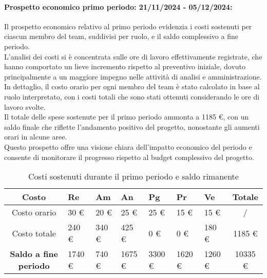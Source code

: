 \paragraph{Prospetto economico primo periodo: 21/11/2024 - 05/12/2024: }
Il prospetto economico relativo al primo periodo evidenzia i costi sostenuti per ciascun membro del team, suddivisi per ruolo, e il saldo complessivo a fine periodo.\\
L'analisi dei costi si è concentrata sulle ore di lavoro effettivamente registrate, che hanno comportato un lieve incremento rispetto al preventivo iniziale, dovuto principalmente a un maggiore impegno nelle attività di analisi e amministrazione.\\
In dettaglio, il costo orario per ogni membro del team è stato calcolato in base al ruolo interpretato, con i costi totali che sono stati ottenuti considerando le ore di lavoro svolte.\\
Il totale delle spese sostenute per il primo periodo ammonta a 1185 \euro, con un saldo finale che riflette l'andamento positivo del progetto, nonostante gli aumenti orari in alcune aree.\\
Questo prospetto offre una visione chiara dell'impatto economico del periodo e consente di monitorare il progresso rispetto al budget complessivo del progetto.
\begin{table}[!h]
    \centering
    \renewcommand{\arraystretch}{1.5}
    \begin{tabularx}{\textwidth}{|c|X|X|X|X|X|X|c|}\hline
    \rowcolor[HTML]{FFD700} 
    \textbf{Costo} & \textbf{Re} & \textbf{Am} & \textbf{An} & \textbf{Pg} & \textbf{Pr} & \textbf{Ve} & \textbf{Totale} \\ \hline
    Costo orario & 30 \euro & 20 \euro & 25 \euro & 25 \euro & 15 \euro & 15 \euro & /  \\ \hline
    Costo totale & 240 \euro & 340 \euro & 425 \euro & 0 \euro & 0 \euro & 180 \euro & 1185 \euro \\ \hline
    \rowcolor[HTML]{FFD700} 
    \textbf{Saldo a fine periodo}  & 1740 \euro & 740 \euro & 1675 \euro & 3300 \euro & 1620 \euro & 1260 \euro & 10335 \euro \\ \hline
    \end{tabularx}
    \caption{Costi sostenuti durante il primo periodo e saldo rimanente}
\end{table}



